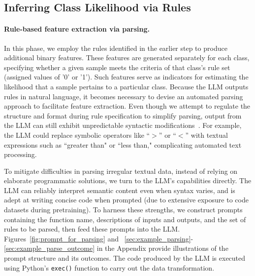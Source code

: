 \subsection{Inferring Class Likelihood via Rules}
\label{Sec:training}

\paragraph{Rule-based feature extraction via parsing.} In this phase, we employ the rules identified in the earlier step to produce additional binary features. These features are generated separately for each class, specifying whether a given sample meets the criteria of that class's rule set (assigned values of '0' or '1'). Such features serve as indicators for estimating the likelihood that a sample pertains to a particular class. Because the LLM outputs rules in natural language, it becomes necessary to devise an automated parsing approach to facilitate feature extraction. Even though we attempt to regulate the structure and format during rule specification to simplify parsing, output from the LLM can still exhibit unpredictable syntactic modifications~\cite{kovavc2023large}. For example, the LLM could replace symbolic operators like ``$>$” or ``$<$” with textual expressions such as ``greater than" or ``less than," complicating automated text processing.

To mitigate difficulties in parsing irregular textual data, instead of relying on elaborate programmatic solutions, we turn to the LLM's capabilities directly. The LLM can reliably interpret semantic content even when syntax varies, and is adept at writing concise code when prompted (due to extensive exposure to code datasets during pretraining). To harness these strengths, we construct prompts containing the function name, descriptions of inputs and outputs, and the set of rules to be parsed, then feed these prompts into the LLM. Figures~\ref{fig:prompt_for_parsing} and ~\ref{sec:example_parsing}-\ref{sec:example_parse_outcome} in the Appendix provide illustrations of the prompt structure and its outcomes. The code produced by the LLM is executed using Python’s \texttt{exec()} function to carry out the data transformation.

\vspace*{-0.12in}
